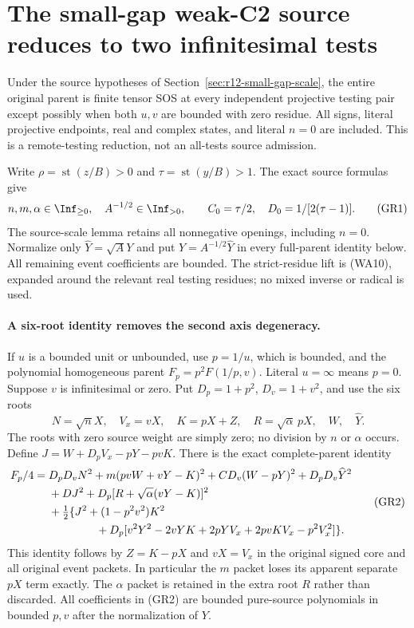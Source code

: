 \section{The small-gap weak-C2 source reduces to two infinitesimal tests}
\label{sec:r12-small-gap-remote}
\begin{theorem}
Under the source hypotheses of Section~\ref{sec:r12-small-gap-scale},
the entire original parent is finite tensor SOS at every independent
projective testing pair except possibly when both $u,v$ are bounded
with zero residue. All signs, literal projective endpoints, real and
complex states, and literal $n=0$ are included. This is a remote-testing
reduction, not an all-tests source admission.
\end{theorem}
Write $\rho=\operatorname{st}(z/B)>0$ and
$\tau=\operatorname{st}(y/B)>1$. The exact source formulas give
\[
 n,m,\alpha\in\Inf_{\ge0},\quad A^{-1/2}\in\Inf_{>0},
 \qquad C_0=\tau/2,\quad D_0=1/[2(\tau-1)].             \tag{GR1}
\]
The source-scale lemma retains all nonnegative openings, including
$n=0$. Normalize only $\widehat Y=\sqrt A Y$ and put
$Y=A^{-1/2}\widehat Y$ in every full-parent identity below.
All remaining event coefficients are bounded. The strict-residue
lift is (WA10), expanded around the relevant real testing residues;
no mixed inverse or radical is used.

\paragraph{A six-root identity removes the second axis degeneracy.}
If $u$ is a bounded unit or unbounded, use $p=1/u$, which is
bounded, and the polynomial homogeneous parent $F_p=p^2F(1/p,v)$.
Literal $u=\infty$ means $p=0$. Suppose $v$ is infinitesimal or zero.
Put $D_p=1+p^2$, $D_v=1+v^2$, and use the six roots
\[
 N=\sqrt n X,\quad V_x=vX,\quad K=pX+Z,\quad
 R=\sqrt\alpha\,pX,\quad W,\quad\widehat Y.
\]
The roots with zero source weight are simply zero; no division by
$n$ or $\alpha$ occurs. Define $J=W+D_pV_x-pY-pvK$.
There is the exact complete-parent identity
\[
\begin{split}
 F_p/4={}&D_pD_vN^2+m(pvW+vY-K)^2+C D_v(W-pY)^2
                         +D_pD_v\widehat Y^2\\
 &+DJ^2+D_p[R+\sqrt\alpha(vY-K)]^2\\
 &+\tfrac12\{J^2+(1-p^2v^2)K^2\\
 &\hspace{15mm}+D_p[v^2Y^2-2vYK+2pYV_x+2pvKV_x-p^2V_x^2]\}.
\end{split}                                                   \tag{GR2}
\]
This identity follows by $Z=K-pX$ and $vX=V_x$ in the original
signed core and all original event packets. In particular the $m$
packet loses its apparent separate $pX$ term exactly. The $\alpha$
packet is retained in the extra root $R$ rather than discarded.
All coefficients in (GR2) are bounded pure-source polynomials in
bounded $p,v$ after the normalization of $Y$.

